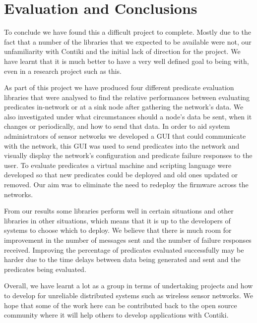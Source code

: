 \section{Evaluation and Conclusions}

To conclude we have found this a difficult project to complete. Mostly due to the fact that a number of the libraries that we expected to be available were not, our unfamiliarity with Contiki and the initial lack of direction for the project. We have learnt that it is much better to have a very well defined goal to being with, even in a research project such as this.

As part of this project we have produced four different predicate evaluation libraries that were analysed to find the relative performances between evaluating predicates in-network or at a sink node after gathering the network's data. We also investigated under what circumstances should a node's data be sent, when it changes or periodically, and how to send that data. In order to aid system administrators of sensor networks we developed a GUI that could communicate with the network, this GUI was used to send predicates into the network and visually display the network's configuration and predicate failure responses to the user. To evaluate predicates a virtual machine and scripting language were developed so that new predicates could be deployed and old ones updated or removed. Our aim was to eliminate the need to redeploy the firmware across the networks.

From our results some libraries perform well in certain situations and other libraries in other situations, which means that it is up to the developers of systems to choose which to deploy. We believe that there is much room for improvement in the number of messages sent and the number of failure responses received. Improving the percentage of predicates evaluated successfully may be harder due to the time delays between data being generated and sent and the predicates being evaluated.

Overall, we have learnt a lot as a group in terms of undertaking projects and how to develop for unreliable distributed systems such as wireless sensor networks. We hope that some of the work here can be contributed back to the open source community where it will help others to develop applications with Contiki.
